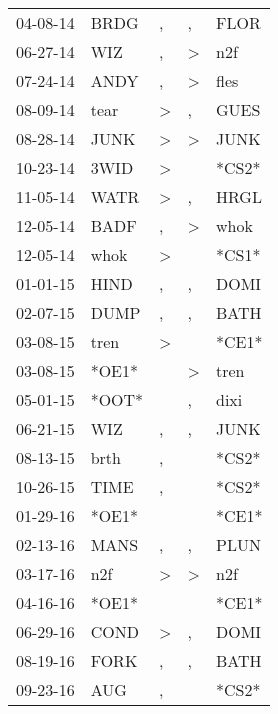 \begin{supertabular}{lllll}
 04-08-14 &   BRDG &                , &                , &   FLOR \\
 06-27-14 &    WIZ &                , &     \textgreater &    n2f \\
 07-24-14 &   ANDY &                , &     \textgreater &   fles \\
 08-09-14 &   tear &     \textgreater &                , &   GUES \\
 08-28-14 &   JUNK &     \textgreater &     \textgreater &   JUNK \\
 10-23-14 &   3WID &     \textgreater &                  &  *CS2* \\
 11-05-14 &   WATR &     \textgreater &                , &   HRGL \\
 12-05-14 &   BADF &                , &     \textgreater &   whok \\
 12-05-14 &   whok &     \textgreater &                  &  *CS1* \\
 01-01-15 &   HIND &                , &                , &   DOMI \\
 02-07-15 &   DUMP &                , &                , &   BATH \\
 03-08-15 &   tren &     \textgreater &                  &  *CE1* \\
 03-08-15 &  *OE1* &                  &     \textgreater &   tren \\
 05-01-15 &  *OOT* &                  &                , &   dixi \\
 06-21-15 &    WIZ &                , &                , &   JUNK \\
 08-13-15 &   brth &                , &                  &  *CS2* \\
 10-26-15 &   TIME &                , &                  &  *CS2* \\
 01-29-16 &  *OE1* &                  &                  &  *CE1* \\
 02-13-16 &   MANS &                , &                , &   PLUN \\
 03-17-16 &    n2f &     \textgreater &     \textgreater &    n2f \\
 04-16-16 &  *OE1* &                  &                  &  *CE1* \\
 06-29-16 &   COND &     \textgreater &                , &   DOMI \\
 08-19-16 &   FORK &                , &                , &   BATH \\
 09-23-16 &    AUG &                , &                  &  *CS2* \\

\end{supertabular}
